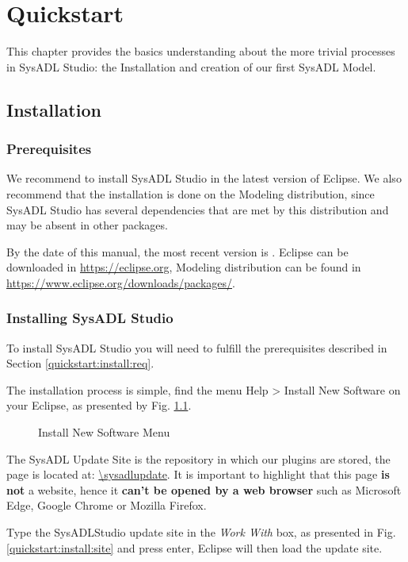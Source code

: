 \chapter{Quickstart}
This chapter provides the basics understanding about the more trivial processes in SysADL Studio: the Installation and creation of our first SysADL Model.

\section{Installation}
\subsection{\label{quickstart:install:req}Prerequisites}
We recommend to install SysADL Studio in the latest version of Eclipse. We also recommend that the installation is done on the Modeling distribution, since SysADL Studio has several dependencies that are met by this distribution and may be absent in other packages.

By the date of this manual, the most recent version is \versionEclipse. Eclipse can be downloaded in \url{https://eclipse.org}, Modeling distribution can be found in \url{https://www.eclipse.org/downloads/packages/}.

\subsection{Installing SysADL Studio}
To install SysADL Studio you will need to fulfill the prerequisites described in Section \ref{quickstart:install:req}.

The installation process is simple, find the menu Help > Install New Software on your Eclipse, as presented by Fig. \ref{quickstart:install:menu}.

\begin{figure}
	\caption{\label{quickstart:install:menu}Install New Software Menu}
\end{figure}

The SysADL Update Site is the repository in which our plugins are stored, the page is located at: \url{\sysadlupdate}. It is important to highlight that this page \textbf{is not} a website, hence it \textbf{can't be opened by a web browser} such as Microsoft Edge, Google Chrome or Mozilla Firefox.

Type the SysADLStudio update site in the \textit{Work With} box, as presented in Fig. \ref{quickstart:install:site} and press enter, Eclipse will then load the update site.

